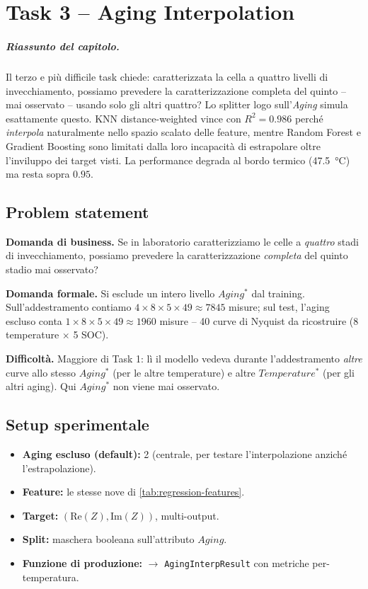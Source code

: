 \chapter{Task 3 -- Aging Interpolation}
\label{chap:task3}

\paragraph{Riassunto del capitolo.} Il terzo e più difficile task
chiede: caratterizzata la cella a quattro livelli di invecchiamento,
possiamo prevedere la caratterizzazione completa del quinto -- mai
osservato -- usando solo gli altri quattro? Lo splitter \acrshort{logo}
sull'\emph{Aging} simula esattamente questo. KNN distance-weighted
vince con $R^{2} = 0.986$ perché \emph{interpola} naturalmente nello
spazio scalato delle feature, mentre Random Forest e Gradient Boosting
sono limitati dalla loro incapacità di estrapolare oltre l'inviluppo dei
target visti. La performance degrada al bordo termico
(\SI{47.5}{\celsius}) ma resta sopra $0.95$.

\section{Problem statement}

\textbf{Domanda di business.} Se in laboratorio caratterizziamo le celle a
\emph{quattro} stadi di invecchiamento, possiamo prevedere la
caratterizzazione \emph{completa} del quinto stadio mai osservato?

\textbf{Domanda formale.} Si esclude un intero livello $Aging^*$ dal
training. Sull'addestramento contiamo $4 \times 8 \times 5 \times 49
\approx 7845$ misure; sul test, l'aging escluso conta
$1 \times 8 \times 5 \times 49 \approx 1960$ misure -- 40 curve di Nyquist
da ricostruire (8 temperature $\times$ 5 SOC).

\textbf{Difficoltà.} Maggiore di Task 1: lì il modello vedeva durante
l'addestramento \emph{altre} curve allo stesso $Aging^*$ (per le altre
temperature) e altre $Temperature^*$ (per gli altri aging). Qui $Aging^*$
non viene mai osservato.

\section{Setup sperimentale}

\begin{itemize}
  \item \textbf{Aging escluso (default):} 2 (centrale, per testare
        l'interpolazione anziché l'estrapolazione).
  \item \textbf{Feature:} le stesse nove di \cref{tab:regression-features}.
  \item \textbf{Target:} $(\mathrm{Re}(Z), \mathrm{Im}(Z))$, multi-output.
  \item \textbf{Split:} maschera booleana sull'attributo $Aging$.
  \item \textbf{Funzione di produzione:}
        $\to$ \texttt{AgingInterpResult} con metriche per-temperatura.
\end{itemize}

